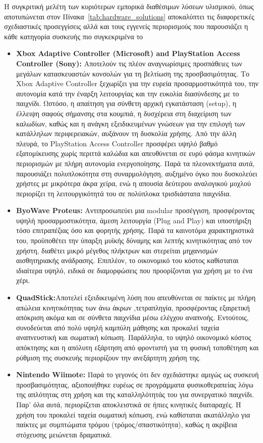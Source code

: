 \documentclass[twoside, a4paper, 11pt]{article}
\begin{document}
Η συγκριτική μελέτη των κυριότερων εμπορικά διαθέσιμων λύσεων υλισμικού, όπως αποτυπώνεται 
στον Πίνακα~\ref{tab:hardware_solutions} αποκαλύπτει τις διαφορετικές σχεδιαστικές προσεγγίσεις αλλά και τους εγγενείς περιορισμούς που παρουσιάζει η κάθε κατηγορία συσκευής πιο συγκεκριμένα το
\begin{itemize}
    \item \textbf{Xbox Adaptive Controller (Microsoft) and PlayStation Access Controller (Sony):} Αποτελούν τις πλέον αναγνωρίσιμες προσπάθειες των μεγάλων κατασκευαστών κονσολών για τη βελτίωση της προσβασιμότητας. 
    Το Xbox Adaptive Controller ξεχωρίζει για την ευρεία προσαρμοστικότητά του, την αυτονομία κατά την έναρξη λειτουργίας και την ευκολία διασύνδεσης με το παιχνίδι. Ωστόσο, η απαίτηση για σύνθετη αρχική εγκατάσταση (setup), η έλλειψη σαφούς σήμανσης στα κουμπιά, η δυσχέρεια στη διαχείριση των καλωδίων, καθώς και η ανάγκη εξειδικευμένων γνώσεων για την επιλογή των κατάλληλων περιφερειακών, αυξάνουν τη δυσκολία χρήσης. 
Από την άλλη πλευρά, το PlayStation Access Controller προσφέρει υψηλό βαθμό εξατομίκευσης χωρίς περιττά καλώδια και απευθύνεται σε ευρύ φάσμα κινητικών περιορισμών με πλήρη αυτονομία ενεργοποίησης. Παρά τα πλεονεκτήματα αυτά, παρουσιάζει πολυπλοκότητα στη συναρμολόγηση, αυξημένο όγκο που δυσκολεύει χρήστες με μικρότερα άκρα χείρα, ενώ η απουσία δεύτερου αναλογικού μοχλού περιορίζει τη λειτουργικότητά του σε πολύπλοκα τρισδιάστατα παιχνίδια. 
    \item \textbf{ByoWave Proteus:} Αντιπροσωπεύει μια modular προσέγγιση, προσφέροντας υψηλή προσαρμοστικότητα, άμεση λειτουργία (Plug and Play) και υποστήριξη τόσο επιτραπέζιας όσο και φορητής χρήσης. Παρά τα καινοτόμα χαρακτηριστικά του, προϋποθέτει την ύπαρξη μυϊκής δύναμης και λεπτής κινητικότητας από τον χρήστη, διαθέτει μικρό μέγεθος πλήκτρων και στερείται μηχανισμών αισθητηριακής ανάδρασης. Επιπλέον, το οικονομικό του κόστος καθίσταται ιδιαίτερα υψηλό, ειδικά σε διαμορφώσεις που προορίζονται για χρήση με το ένα χέρι.
    \item \textbf{QuadStick:}Αποτελεί εξειδικευμένη λύση που απευθύνεται σε παίκτες με πλήρη απώλεια κινητικότητας των άνω άκρων ,τετραπληγία, προσφέροντας εξαιρετική απόκριση ακόμα και σε σύνθετα παιχνίδια μέσω ελέγχου αναπνοής. Εντούτοις, συνοδεύεται από πολύ υψηλή καμπύλη μάθησης και προκαλεί ταχεία αναπνευστική και σωματική κόπωση. Παράλληλα, το υψηλό οικονομικό κόστος απόκτησης και η απόλυτη εξάρτηση από φροντιστή για τη φυσική τοποθέτηση και ρύθμιση της συσκευής περιορίζουν την ανεξάρτητη χρήση της.
    \item \textbf{Nintendo Wiimote:} Παρά το γεγονός ότι δεν σχεδιάστηκε αμιγώς ως συσκευή προσβασιμότητας, αξιοποιήθηκε ευρέως σε προγράμματα φυσικοθεραπείας λόγω της απλότητας στη χρήση και της καταλληλότητάς του για συνεργατικό παιχνίδι. Παρ' όλα αυτά, περιορίζεται αποκλειστικά σε ήπιες κινητικές διαταραχές. Η χρήση του προκαλεί ταχεία σωματική κόπωση, ενώ καθίσταται ακατάλληλο για παίκτες με συμπτώματα τρόμου (τρόμος/σπαστικότητα), καθώς η ακρίβεια στόχευσης μειώνεται δραματικά.
\end{itemize}
\end{document}
